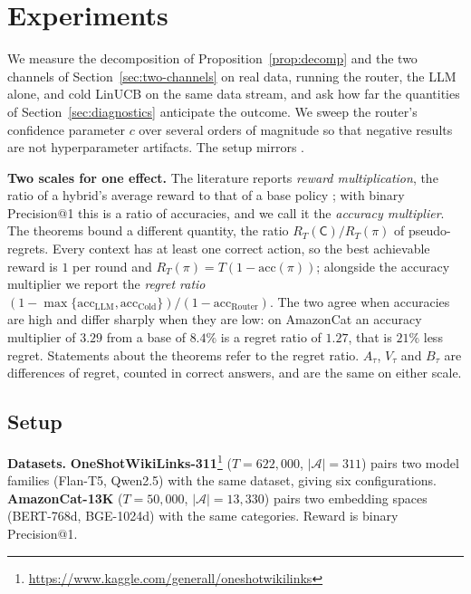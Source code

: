 \documentclass{article}
\theoremstyle{definition}
\theoremstyle{remark}
\theoremstyle{remark}
\newcommand{\Cold}{\mathsf{C}}
\begin{document}
\section{Experiments}
\label{sec:experiments}

We measure the decomposition of Proposition~\ref{prop:decomp} and the two
channels of Section~\ref{sec:two-channels} on real data, running the router,
the LLM alone, and cold LinUCB on the same data stream, and ask how far the
quantities of Section~\ref{sec:diagnostics} anticipate the outcome. We sweep
the router's confidence parameter $c$ over several orders of magnitude so that
negative results are not hyperparameter artifacts. The setup mirrors
\cite{chen2024llmdecision}.

\textbf{Two scales for one effect.} The literature reports \emph{reward
multiplication}, the ratio of a hybrid's average reward to that of a base
policy \cite{chen2024llmdecision}; with binary Precision@1 this is a ratio of
accuracies, and we call it the \emph{accuracy multiplier}. The theorems bound
a different quantity, the ratio $R_T(\Cold)/R_T(\pi)$ of pseudo-regrets. Every
context has at least one correct action, so the best achievable reward is $1$
per round and $R_T(\pi)=T(1-\mathrm{acc}(\pi))$; alongside the accuracy
multiplier we report the \emph{regret ratio}
$(1-\max\{\mathrm{acc}_{\mathrm{LLM}},\mathrm{acc}_{\mathrm{Cold}}\})/(1-\mathrm{acc}_{\mathrm{Router}})$.
The two agree when accuracies are high and differ sharply when they are low:
on AmazonCat an accuracy multiplier of $3.29$ from a base of $8.4\%$ is a
regret ratio of $1.27$, that is $21\%$ less regret. Statements about the
theorems refer to the regret ratio. $A_\tau$, $V_\tau$ and $B_\tau$ are
differences of regret, counted in correct answers, and are the same on either
scale.

\subsection{Setup}
\label{sec:exp-setup}

\textbf{Datasets.} \textbf{OneShotWikiLinks-311}\footnote{\url{https://www.kaggle.com/generall/oneshotwikilinks}} ($T\!=\!622{,}000$,
$|\mathcal A|\!=\!311$) pairs two model families (Flan-T5, Qwen2.5) with the
same dataset, giving six configurations. \textbf{AmazonCat-13K}
\cite{bhatia2016extreme} ($T\!=\!50{,}000$, $|\mathcal A|\!=\!13{,}330$) pairs two embedding spaces
(BERT-768d, BGE-1024d) with the same categories. Reward is binary
Precision@1.
\end{document}
